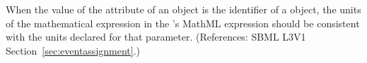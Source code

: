 When the value of the attribute  of an \EventAssignment
object is the identifier of a \Parameter object, the units of the
mathematical expression in the \EventAssignment's MathML 
expression should be consistent with the units declared for that parameter.
(References: SBML L3V1 Section~\ref{sec:eventassignment}.)
